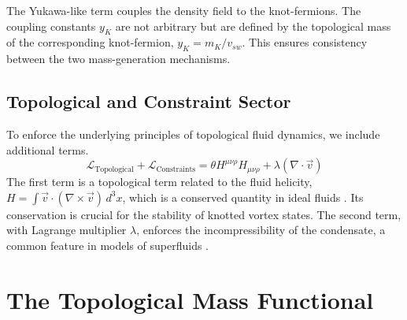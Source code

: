 \documentclass[12pt, a4paper]{article}
\begin{document}
    The Yukawa-like term couples the density field to the knot-fermions. The coupling constants $y_K$ are not arbitrary but are defined by the topological mass of the corresponding knot-fermion, $y_K = m_K / v_{sw}$. This ensures consistency between the two mass-generation mechanisms.

    \subsection{Topological and Constraint Sector}
    To enforce the underlying principles of topological fluid dynamics, we include additional terms.
    \begin{equation}
        \mathcal{L}_{\text{Topological}} + \mathcal{L}_{\text{Constraints}} = \theta H^{\mu\nu\rho} H_{\mu\nu\rho} + \lambda(\nabla \cdot \vec{v})
    \end{equation}
    The first term is a topological term related to the fluid helicity, $H = \int \vec{v} \cdot (\nabla \times \vec{v}) \, d^3x$, which is a conserved quantity in ideal fluids \cite{Moffatt1969, Arnold1998}. Its conservation is crucial for the stability of knotted vortex states. The second term, with Lagrange multiplier $\lambda$, enforces the incompressibility of the condensate, a common feature in models of superfluids \cite{Volovik2003}.

    \section{The Topological Mass Functional}
    \label{sec:mass_functional}
\end{document}
